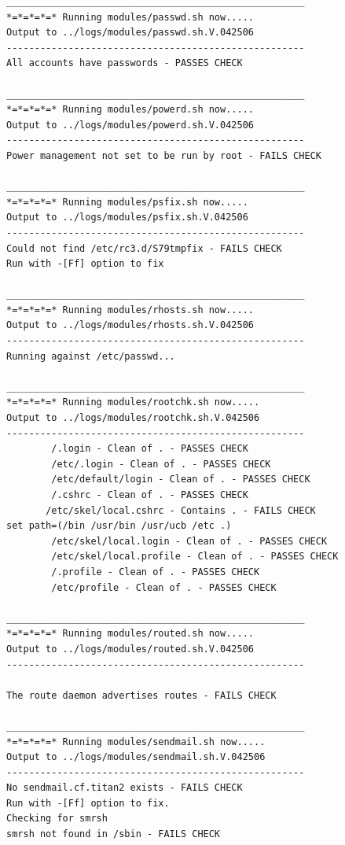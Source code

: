 \begin{verbatim}
_____________________________________________________
*=*=*=*=* Running modules/passwd.sh now.....
Output to ../logs/modules/passwd.sh.V.042506
-----------------------------------------------------
All accounts have passwords - PASSES CHECK

_____________________________________________________
*=*=*=*=* Running modules/powerd.sh now.....
Output to ../logs/modules/powerd.sh.V.042506
-----------------------------------------------------
Power management not set to be run by root - FAILS CHECK

_____________________________________________________
*=*=*=*=* Running modules/psfix.sh now.....
Output to ../logs/modules/psfix.sh.V.042506
-----------------------------------------------------
Could not find /etc/rc3.d/S79tmpfix - FAILS CHECK
Run with -[Ff] option to fix

_____________________________________________________
*=*=*=*=* Running modules/rhosts.sh now.....
Output to ../logs/modules/rhosts.sh.V.042506
-----------------------------------------------------
Running against /etc/passwd...

_____________________________________________________
*=*=*=*=* Running modules/rootchk.sh now.....
Output to ../logs/modules/rootchk.sh.V.042506
-----------------------------------------------------
        /.login - Clean of . - PASSES CHECK
        /etc/.login - Clean of . - PASSES CHECK
        /etc/default/login - Clean of . - PASSES CHECK
        /.cshrc - Clean of . - PASSES CHECK
       /etc/skel/local.cshrc - Contains . - FAILS CHECK
set path=(/bin /usr/bin /usr/ucb /etc .)
        /etc/skel/local.login - Clean of . - PASSES CHECK
        /etc/skel/local.profile - Clean of . - PASSES CHECK
        /.profile - Clean of . - PASSES CHECK
        /etc/profile - Clean of . - PASSES CHECK

_____________________________________________________
*=*=*=*=* Running modules/routed.sh now.....
Output to ../logs/modules/routed.sh.V.042506
-----------------------------------------------------

The route daemon advertises routes - FAILS CHECK

_____________________________________________________
*=*=*=*=* Running modules/sendmail.sh now.....
Output to ../logs/modules/sendmail.sh.V.042506
-----------------------------------------------------
No sendmail.cf.titan2 exists - FAILS CHECK
Run with -[Ff] option to fix.
Checking for smrsh
smrsh not found in /sbin - FAILS CHECK


\end{verbatim}
